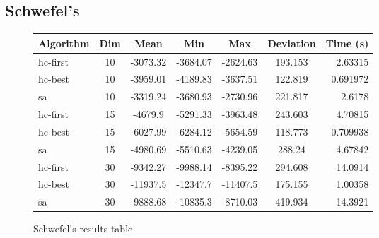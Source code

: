 \documentclass{article}
\begin{document}
    \subsection{Schwefel's}
        \begin{figure}[H]
            \centering
            \begin{tabular}{|l|c|c|c|c|c|r|}
                \hline Algorithm & Dim & Mean & Min & Max & Deviation & Time (s) \\
                \hline hc-first & 10 & -3073.32 & -3684.07 & -2624.63 & 193.153 & 2.63315 \\
                \hline hc-best & 10 & -3959.01 & -4189.83 & -3637.51 & 122.819 & 0.691972 \\
                \hline sa & 10 & -3319.24 & -3680.93 & -2730.96 & 221.817 & 2.6178 \\
                \hline hc-first & 15 & -4679.9 & -5291.33 & -3963.48 & 243.603 & 4.70815 \\
                \hline hc-best & 15 & -6027.99 & -6284.12 & -5654.59 & 118.773 & 0.709938 \\
                \hline sa & 15 & -4980.69 & -5510.63 & -4239.05 & 288.24 & 4.67842 \\
                \hline hc-first & 30 & -9342.27 & -9988.14 & -8395.22 & 294.608 & 14.0914 \\
                \hline hc-best & 30 & -11937.5 & -12347.7 & -11407.5 & 175.155 & 1.00358 \\
                \hline sa & 30 & -9888.68 & -10835.3 & -8710.03 & 419.934 & 14.3921 \\
                \hline
            \end{tabular}
            \caption{Schwefel's results table}
        \end{figure}
\end{document}
